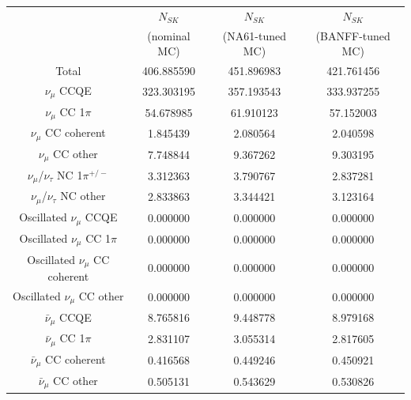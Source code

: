%
%
\begin{table}
\centering
\begin{tabular}{| c | c | c | c | }
\hline
                                                     & $N_{SK}$     & $N_{SK}$          & $N_{SK}$          \\
                                                     & (nominal MC) & (NA61-tuned MC)  & (BANFF-tuned MC)  \\
\hline
Total                                                  & 406.885590   & 451.896983  & 421.761456 \\
\hline
$\nu_\mu$ CCQE                                         & 323.303195   & 357.193543  & 333.937255 \\
$\nu_\mu$ CC 1$\pi$                                    &  54.678985   &  61.910123  &  57.152003 \\
$\nu_\mu$ CC coherent                                  &   1.845439   &   2.080564  &   2.040598 \\
$\nu_\mu$ CC other                                     &   7.748844   &   9.367262  &   9.303195 \\
$\nu_\mu$/$\nu_\tau$ NC 1$\pi^{+/-}$                   &   3.312363   &   3.790767  &   2.837281 \\
$\nu_\mu$/$\nu_\tau$ NC other                          &   2.833863   &   3.344421  &   3.123164 \\
Oscillated $\nu_\mu$ CCQE                              &   0.000000   &   0.000000  &   0.000000 \\
Oscillated $\nu_\mu$ CC 1$\pi$                         &   0.000000   &   0.000000  &   0.000000 \\
Oscillated $\nu_\mu$ CC coherent                       &   0.000000   &   0.000000  &   0.000000 \\
Oscillated $\nu_\mu$ CC other                          &   0.000000   &   0.000000  &   0.000000 \\
$\bar{\nu}_{\mu}$ CCQE                                 &   8.765816   &   9.448778  &   8.979168 \\
$\bar{\nu}_{\mu}$ CC 1$\pi$                            &   2.831107   &   3.055314  &   2.817605 \\
$\bar{\nu}_{\mu}$ CC coherent                          &   0.416568   &   0.449246  &   0.450921 \\
$\bar{\nu}_{\mu}$ CC other                             &   0.505131   &   0.543629  &   0.530826 \\

\end{tabular}
\end{table}
